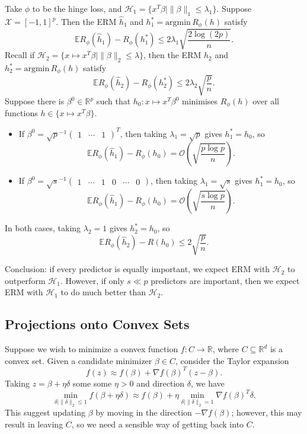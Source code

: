 \documentclass[12pt]{article}
\begin{document}
\begin{exbox}
	Take $\phi$ to be the hinge loss, and $\mathcal{H}_1 = \{x^T \beta \mid \|\beta\|_1 \leq \lambda_1\}$. Suppose $\mathcal{X} = [-1, 1]^p$. Then the ERM $\hat h_1$ and $h_1^\ast = \mathrm{argmin}\, R_\phi(h)$ satisfy
	\[
		\mathbb{E} R_\phi(\hat h_1) - R_\phi(h_1^\ast) \leq 2 \lambda_1 \sqrt{ \frac{2 \log(2p)}{n}}.
	\]
	Recall if $\mathcal{H}_2 = \{x \mapsto x^T \beta \mid \|\beta\|_2 \leq \lambda\}$, then the ERM $\hat h_2$ and $h_2^\ast = \mathrm{argmin}\, R_\phi(h)$ satisfy
	\[
		\mathbb{E} R_\phi(\hat h_2) - R_\phi(h_2^\ast) \leq 2 \lambda_2 \sqrt{\frac{p}{n}}.
	\]
	Suppose there is $\beta^0 \in \mathbb{R}^p$ such that $h_0 : x \mapsto x^T \beta^0$ minimises $R_\phi(h)$ over all functions $h \in \{x \mapsto x^T \beta\}$.

	\begin{itemize}
		\item If $\beta^0 = \sqrt{p}^{-1}
			\begin{pmatrix}
				1 & \cdots & 1
			\end{pmatrix}^T
			$, then taking $\lambda_1 = \sqrt{p}$ gives $h_1^\ast = h_0$, so
			\[
				\mathbb{E} R_\phi(\hat h_1) - R_\phi(h_0) = \mathcal{O} \left( \sqrt{\frac{p \log p}{n}} \right).
			\]
		\item If $\beta^0 = \sqrt{s}^{-1}
			\begin{pmatrix}
				1 & \cdots & 1 & 0 & \cdots & 0
			\end{pmatrix}
			$, then taking $\lambda_1 = \sqrt{s}$ gives $h_1^\ast = h_0$, so
			\[
				\mathbb{E} R_\phi(\hat h_1) - R_\phi(h_0) = \mathcal{O}\left(\sqrt{ \frac{s \log p}{n}} \right).
			\]
	\end{itemize}
	In both cases, taking $\lambda_2 = 1$ gives $h_2^\ast = h_0$, so
	\[
		\mathbb{E} R_\phi(\hat h_2) - R(h_0) \leq 2 \sqrt{\frac{p}{n}}.
	\]
\end{exbox}

Conclusion: if every predictor is equally important, we expect ERM with $\mathcal{H}_2$ to outperform $\mathcal{H}_1$. However, if only $s \ll p$ predictors are important, then we expect ERM with $\mathcal{H}_1$ to do much better than $\mathcal{H}_2$.


\subsection{Projections onto Convex Sets}
\label{sub:proj_conv}

Suppose we wish to minimize a convex function $f : C \to \mathbb{R}$, where $C \subseteq \mathbb{R}^d$ is a convex set. Given a candidate minimizer $\beta \in C$, consider the Taylor expansion
\[
f(z) \approx f(\beta) + \nabla f(\beta)^T (z - \beta).
\]
Taking $z = \beta + \eta \delta$ some some $\eta > 0$ and direction $\delta$, we have
\[
\min_{\delta \mid \|\delta\|_2 \leq 1} f(\beta + \eta \delta) \approx f(\beta) + \eta \min_{\delta \mid \|\delta\|_2 = 1} \nabla f(\beta)^T \delta.
\]
This suggest updating $\beta$ by moving in the direction $- \nabla f(\beta)$; however, this may result in leaving $C$, so we need a sensible way of getting back into $C$.
\end{document}
